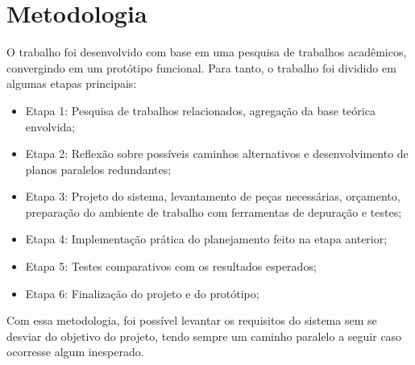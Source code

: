\chapter{Metodologia}
\label{Métodos de implementação}

O trabalho foi desenvolvido com base em uma pesquisa de trabalhos acadêmicos, convergindo em um protótipo funcional. Para tanto, o trabalho foi dividido em algumas etapas principais:

\begin{itemize}
\item{Etapa 1: Pesquisa de trabalhos relacionados, agregação da base teórica envolvida;}
\item{Etapa 2: Reflexão sobre possíveis caminhos alternativos e desenvolvimento de planos paralelos redundantes;}
\item{Etapa 3: Projeto do sistema, levantamento de peças necessárias, orçamento, preparação do ambiente de trabalho com ferramentas de depuração e testes;}
\item{Etapa 4: Implementação prática do planejamento feito na etapa anterior;}
\item{Etapa 5: Testes comparativos com os resultados esperados;}
\item{Etapa 6: Finalização do projeto e do protótipo;}
\end{itemize}

Com essa metodologia, foi possível levantar os requisitos do sistema sem se desviar do objetivo do projeto, tendo sempre um caminho paralelo a seguir caso ocorresse algum inesperado.